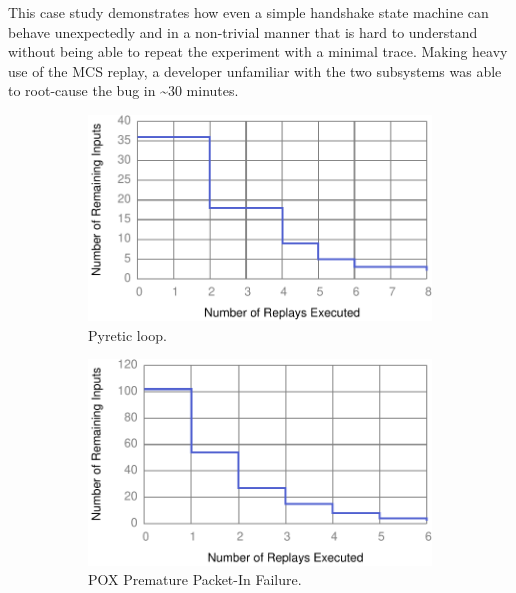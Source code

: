 This case study demonstrates how even a simple handshake state machine can
behave unexpectedly and in a non-trivial manner that is hard to understand
without being able to repeat the experiment with a minimal trace. Making heavy
use of the MCS replay, a developer unfamiliar with the two subsystems
was able to root-cause the bug in \textasciitilde30 minutes.
\begin{figure}[!htb]
\begin{subfigure}{0.33\textwidth}
    \includegraphics[width=\textwidth]{../graphs/runtime/pyretic_loop.pdf}
    \caption[]{\label{fig:pyretic_loop} Pyretic loop.}
\end{subfigure}\hfill
\begin{subfigure}{0.33\textwidth}
    \includegraphics[width=\textwidth]{../graphs/runtime/pox_early_packetin.pdf}
    \caption[]{\label{fig:pox_handshake} POX Premature Packet-In Failure.}
\end{subfigure}\hfill
\begin{subfigure}{0.33\textwidth}

\end{subfigure}
\end{figure}
